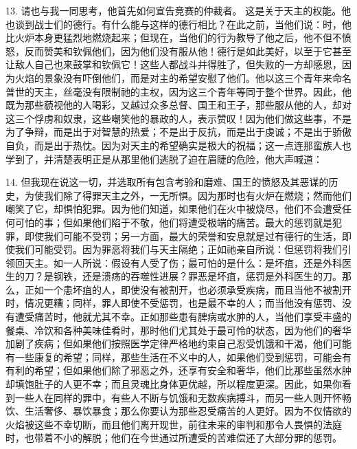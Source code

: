 13. 请也与我一同思考，他首先如何宣告竞赛的仲裁者。 这是关于天主的权能。他也谈到战士们的德行。有什么能与这样的德行相比？在此之前，当他们说：时，他比火炉本身更猛烈地燃烧起来；但现在，当他们的行为教导了他之后，他不但不愤怒，反而赞美和钦佩他们，因为他们没有服从他！德行是如此美好，以至于它甚至让敌人自己也来鼓掌和钦佩它！这些人都战斗并得胜了，但失败的一方却感恩，因为火焰的景象没有吓倒他们，而是对主的希望安慰了他们。他以这三个青年来命名普世的天主，丝毫没有限制祂的主权，因为这三个青年等同于整个世界。因此，他既为那些藐视他的人喝彩，又越过众多总督、国王和王子，那些服从他的人，却对这三个俘虏和奴隶，这些嘲笑他的暴政的人，表示赞叹！因为他们做这些事，不是为了争辩，而是出于对智慧的热爱；不是出于反抗，而是出于虔诚；不是出于骄傲自负，而是出于热忱。因为对天主的希望确实是极大的祝福；这一点连那蛮族人也学到了，并清楚表明正是从那里他们逃脱了迫在眉睫的危险，他大声喊道：\par

14. 但我现在说这一切，并选取所有包含考验和磨难、国王的愤怒及其恶谋的历史，为使我们除了得罪天主之外，一无所惧。因为那时也有火炉在燃烧；然而他们嘲笑了它，却惧怕犯罪。因为他们知道，如果他们在火中被烧尽，他们不会遭受任何可怕的事；但如果他们陷于不敬，他们将遭受极端的痛苦。最大的惩罚就是犯罪，即使我们可能不受罚；另一方面，最大的荣誉和安息就是过有德行的生活，即使我们可能受罚。因为罪恶将我们与天主隔绝；正如祂亲自所说：但惩罚将我们引领回天主。如一人所说：假设有人受了伤；最可怕的是什么：是坏疽，还是外科医生的刀？是钢铁，还是溃疡的吞噬性进展？罪恶是坏疽，惩罚是外科医生的刀。那么，正如一个患坏疽的人，即使没有被割开，也必须承受疾病，而且当他不被割开时，情况更糟；同样，罪人即使不受惩罚，也是最不幸的人；而当他没有惩罚、没有遭受痛苦时，他就尤其不幸。正如那些患有脾病或水肿的人，当他们享受丰盛的餐桌、冷饮和各种美味佳肴时，那时他们尤其处于最可怜的状态，因为他们的奢华加剧了疾病；但如果他们按照医学定律严格地约束自己忍受饥饿和干渴，他们可能有一些康复的希望；同样，那些生活在不义中的人，如果他们受到惩罚，可能会有有利的希望；但如果他们除了邪恶之外，还享有安全和奢华，他们比那些虽然水肿却填饱肚子的人更不幸；而且灵魂比身体更优越，所以程度更深。因此，如果你看到一些人在同样的罪中，有些人不断与饥饿和无数疾病搏斗，而另一些人则开怀畅饮、生活奢侈、暴饮暴食；那么你要认为那些忍受痛苦的人更好。因为不仅情欲的火焰被这些不幸切断，而且他们离开现世，前往未来的审判和那令人畏惧的法庭时，也带着不小的解脱；他们在今世通过所遭受的苦难偿还了大部分罪的惩罚。\par

